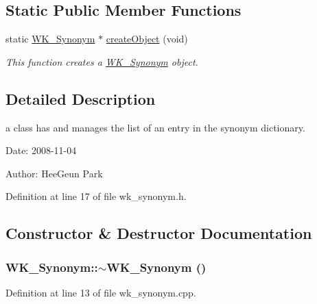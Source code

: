 \subsection*{Static Public Member Functions}
\begin{CompactItemize}
\item 
static \hyperlink{classWK__Synonym}{WK\_\-Synonym} $\ast$ \hyperlink{classWK__Synonym_824bece2d0ac214d9727afabaf3339a3}{createObject} (void)
\begin{CompactList}\small\item\em This function creates a \hyperlink{classWK__Synonym}{WK\_\-Synonym} object. \item\end{CompactList}\end{CompactItemize}


\subsection{Detailed Description}
a class has and manages the list of an entry in the synonym dictionary. 

\begin{Desc}
\item[Date:]2008-11-04 \end{Desc}
\begin{Desc}
\item[Author:]HeeGeun Park \end{Desc}


Definition at line 17 of file wk\_\-synonym.h.

\subsection{Constructor \& Destructor Documentation}
\hypertarget{classWK__Synonym_ce4316ab85a3a9e85bfa3ad3f01b3d2e}{
\subsubsection[{$\sim$WK\_\-Synonym}]{\setlength{\rightskip}{0pt plus 5cm}WK\_\-Synonym::$\sim$WK\_\-Synonym ()}}
\label{classWK__Synonym_ce4316ab85a3a9e85bfa3ad3f01b3d2e}




Definition at line 13 of file wk\_\-synonym.cpp.

